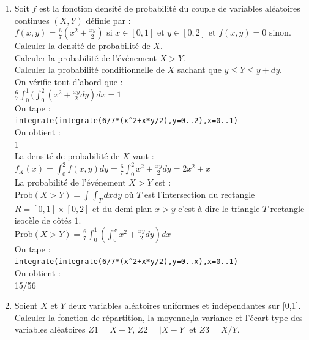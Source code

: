 \documentclass[a4paper,11pt]{book}
\begin{document}
\begin{enumerate}
\item Soit  $f$ est la fonction  densit\'e de probabilit\'e du couple de 
variables al\'eatoires continues $(X,Y)$ d\'efinie par :\\
$\displaystyle f(x,y)=\frac{6}{7}(x^2+\frac{xy}{2})$ si $x\in [0,1]$ et 
$y\in [0,2]$ et $f(x,y)=0$ sinon.\\
Calculer la densit\'e de probabilit\'e de $X$.\\
Calculer la probabilit\'e de l'\'ev\'enement $X>Y$.\\
Calculer la probabilit\'e conditionnelle de $X$ sachant que $y\leq Y\leq y+dy$.\\

On v\'erifie tout d'abord que :\\
$\frac{6}{7}\int_0^1(\int_0^2 (x^2+\frac{xy}{2}dy)dx=1$\\
On tape :\\
{\tt integrate(integrate(6/7*(x\verb|^|2+x*y/2),y=0..2),x=0..1)}\\
On obtient :\\
{1}\\
La densit\'e de probabilit\'e de $X$ vaut :\\
$f_X(x)=\int_0^2f(x,y)dy=\frac{6}{7}\int_0^2x^2+\frac{xy}{2}dy=2x^2+x$\\
La probabilit\'e de l'\'ev\'enement $X>Y$ est :\\
$\mbox{Prob}(X>Y)=\int\int_Tdxdy$ o\`u $T$ est l'intersection du rectangle 
$R=[0,1]\times [0,2]$ et du demi-plan $x>y$ c'est \`a dire le triangle $T$
rectangle isoc\`ele de c\^ot\'es $1$.\\
$\mbox{Prob}(X>Y)=\frac{6}{7}\int_0^1(\int_0^xx^2+\frac{xy}{2}dy)dx$\\
On tape :\\
{\tt integrate(integrate(6/7*(x\verb|^|2+x*y/2),y=0..x),x=0..1)}\\
On obtient :\\
{15/56}


\item Soient $X$ et $Y$ deux variables al\'eatoires uniformes et ind\'ependantes
sur [0,1].\\ 
Calculer la fonction de r\'epartition, la moyenne,la variance et l'\'ecart type
des variables al\'eatoires $Z1=X+Y$, $Z2=|X-Y|$ et $Z3=X/Y$.\\


\end{enumerate}
\end{document}
